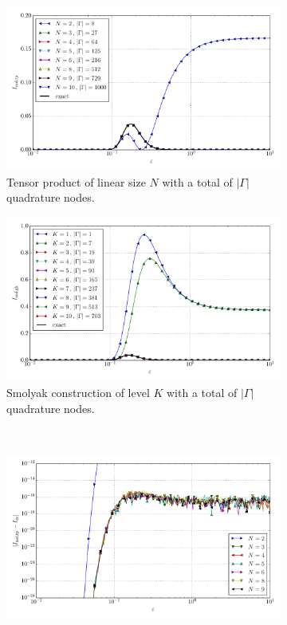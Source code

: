 \documentclass[a4paper,10pt]{article}
\begin{document}
\begin{figure}[ht!]
  \begin{subfigure}[t]{0.5\linewidth}
    \includegraphics[width=\linewidth]{./plots/tp_sg_3d_conv_eps_(4,0,0)_(0,4,0)_val_nsd_tp.pdf}
    \caption{Tensor product of linear size $N$ with a total of $|\Gamma|$ quadrature nodes.}
    \label{fig:tp_sg_3d_conv_eps_400_040_val_nsd_tp}
  \end{subfigure}
  \begin{subfigure}[t]{0.5\linewidth}
    \includegraphics[width=\linewidth]{./plots/tp_sg_3d_conv_eps_(4,0,0)_(0,4,0)_val_nsd_gk.pdf}
    \caption{Smolyak construction of level $K$ with a total of $|\Gamma|$ quadrature nodes.}
    \label{fig:tp_sg_3d_conv_eps_400_040_val_nsd_gk}
  \end{subfigure} \\
  \begin{subfigure}[t]{0.5\linewidth}
    \includegraphics[width=\linewidth]{./plots/tp_sg_3d_conv_eps_(4,0,0)_(0,4,0)_err_nsd_tp.pdf}

\end{subfigure}
\end{figure}
\end{document}
